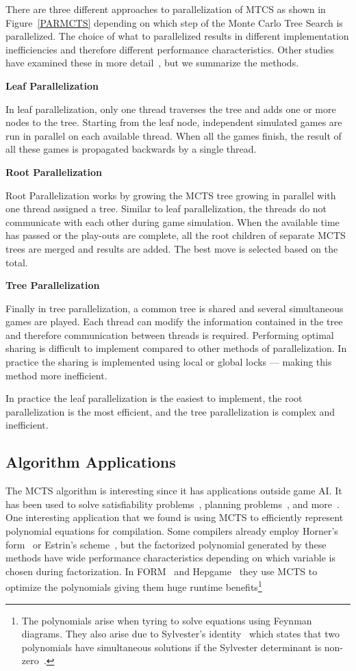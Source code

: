 \documentclass[nocopyrightspace, 10pt]{sigplanconf}
\begin{document}
There are three different approaches to parallelization of MTCS as shown in Figure~\ref{PARMCTS} depending on which step of the Monte Carlo Tree Search is parallelized. The choice of what to parallelized results in different implementation inefficiencies and therefore different performance characteristics. Other studies have examined these in more detail~\cite{SCAI11,gpugo}, but we summarize the methods.

\textbf{Leaf Parallelization}

In leaf parallelization, only one thread traverses the tree and adds one or more nodes to the tree. Starting from the leaf node, independent simulated games are run in parallel on each available thread. When all the games finish, the result of all these games is propagated backwards by a single thread.

\textbf{Root Parallelization}

Root Parallelization works by growing the MCTS tree growing in parallel with one thread assigned a tree. Similar to leaf parallelization, the threads do not communicate with each other during game simulation. When the available time has passed or the play-outs are complete, all the root children of separate MCTS trees are merged and results are added. The best move is selected based on the total.

\textbf{Tree Parallelization}

Finally in tree parallelization, a common tree is shared and several simultaneous games are played. Each thread can modify the information contained in the tree and therefore communication between threads is required. Performing optimal sharing is difficult to implement compared to other methods of parallelization. In practice the sharing is implemented using local or global locks --- making this method more inefficient.

In practice the leaf parallelization is the easiest to implement, the root parallelization is the most efficient, and the tree parallelization is complex and inefficient.

\subsection{Algorithm Applications}

The MCTS algorithm is interesting since it has applications outside game AI. It has been used 
to solve satisfiability problems~\cite{mcstsat}, planning problems~\cite{mcstplan}, and more~\cite{mcstsurv}. One interesting application that we found is using MCTS to efficiently
represent polynomial equations for compilation. Some compilers already employ Horner's form~\cite{horner} or Estrin's scheme~\cite{estrin}, but the factorized polynomial generated by these methods have wide performance characteristics depending on which variable is chosen during factorization. In FORM~\cite{form} and Hepgame~\cite{hepgame} they use MCTS to optimize the polynomials giving them huge runtime benefits\footnote{The polynomials arise when tyring to solve equations using Feynman diagrams. They also arise due to Sylvester's identity~\cite{sylv} which states that two polynomials have simultaneous solutions if the Sylvester determinant is non-zero~\cite{polyeval}. }
\end{document}
